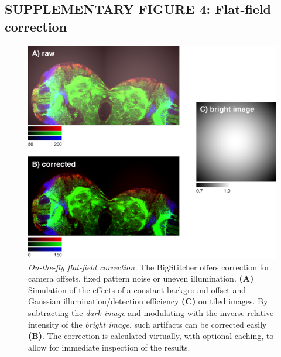 \documentclass[]{spie}  %
\begin{document}
\subsection*{SUPPLEMENTARY FIGURE 4: Flat-field correction}
\vspace{1mm}
\begin{figure}[h!]
\includegraphics[width=\textwidth]{fig-flatfield.png}
\vspace{-2.0mm}
\caption{\hspace{-0.5mm} \emph{On-the-fly flat-field correction.} The BigStitcher offers correction for camera offsets, fixed pattern noise or uneven illumination. \textbf{(A)}  Simulation of the effects of a constant background offset and Gaussian illumination/detection efficiency \textbf{(C)} on tiled images. By subtracting the \emph{dark image} and modulating with the inverse relative intensity of the \emph{bright image}, such artifacts can be corrected easily \textbf{(B)}. The correction is calculated virtually, with optional caching, to allow for immediate inspection of the results.
}
\label{fig:sup-fig-flatfield}
\end{figure}

\pagebreak
\end{document}
